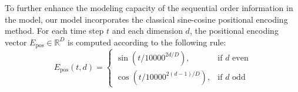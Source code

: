 \documentclass[5p,times,authoryear]{elsarticle}
\begin{document}




To further enhance the modeling capacity of the sequential order information in the model, our model incorporates the classical sine-cosine positional encoding method\citep{vaswani2017attention}. For each time step \(t\) and each dimension \(d\), the positional encoding vector \( E_{\mathrm{pos}} \in \mathbb{R}^{D} \) is computed according to the following rule:
\vspace{-3pt}
\begin{equation}
E_{\mathrm{pos}}(t, d) = 
\begin{cases} 
\sin(t / 10000^{2d/D}), & \text{if } d \text{ even} \\
\cos(t / 10000^{2(d-1)/D}), & \text{if } d \text{ odd}
\end{cases}
\label{eq:sin_cos}
\end{equation}
\vspace{-3pt}
\end{document}
